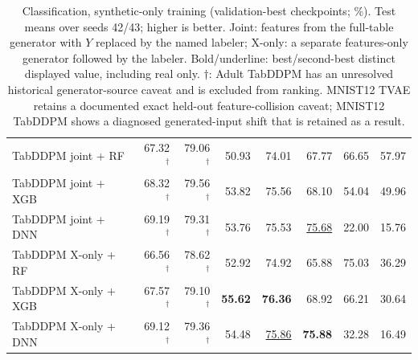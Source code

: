 \begin{table}[p]
\begin{tabular}{@{}lrrrrrrr@{}}
TabDDPM joint + RF & 67.32$^{\dagger}$ & 79.06$^{\dagger}$ & 50.93 & 74.01 & 67.77 & 66.65 & 57.97 \\
TabDDPM joint + XGB & 68.32$^{\dagger}$ & 79.56$^{\dagger}$ & 53.82 & 75.56 & 68.10 & 54.04 & 49.96 \\
TabDDPM joint + DNN & 69.19$^{\dagger}$ & 79.31$^{\dagger}$ & 53.76 & 75.53 & \underline{75.68} & 22.00 & 15.76 \\
TabDDPM X-only + RF & 66.56$^{\dagger}$ & 78.62$^{\dagger}$ & 52.92 & 74.92 & 65.88 & 75.03 & 36.29 \\
TabDDPM X-only + XGB & 67.57$^{\dagger}$ & 79.10$^{\dagger}$ & \textbf{55.62} & \textbf{76.36} & 68.92 & 66.21 & 30.64 \\
TabDDPM X-only + DNN & 69.12$^{\dagger}$ & 79.36$^{\dagger}$ & 54.48 & \underline{75.86} & \textbf{75.88} & 32.28 & 16.49 \\
\bottomrule
\end{tabular}
\caption{Classification, synthetic-only training (validation-best checkpoints; \%). Test means over seeds 42/43; higher is better. Joint: features from the full-table generator with $Y$ replaced by the named labeler; X-only: a separate features-only generator followed by the labeler. Bold/underline: best/second-best distinct displayed value, including real only. $\dagger$: Adult TabDDPM has an unresolved historical generator-source caveat and is excluded from ranking. MNIST12 TVAE retains a documented exact held-out feature-collision caveat; MNIST12 TabDDPM shows a diagnosed generated-input shift that is retained as a result.}
\label{tab:valbest-synthetic}
\end{table}
